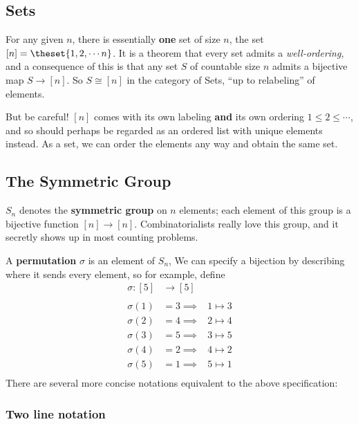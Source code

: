 \hypertarget{sets}{%
\subsection{Sets}\label{sets}}

For any given \(n\), there is essentially \textbf{one} set of size
\(n\), the set \([n] = \theset{1,2,\cdots n}\). It is a theorem that
every set admits a \emph{well-ordering}, and a consequence of this is
that any set \(S\) of countable size \(n\) admits a bijective map
\(S \to [n]\). So \(S \cong [n]\) in the category of Sets, ``up to
relabeling'' of elements.

But be careful! \([n]\) comes with its own labeling \textbf{and } its
own ordering \(1 \leq 2 \leq \cdots\), and so should perhaps be regarded
as an ordered list with unique elements instead. As a set, we can order
the elements any way and obtain the same set.

\hypertarget{the-symmetric-group}{%
\subsection{The Symmetric Group}\label{the-symmetric-group}}

\(S_n\) denotes the \textbf{symmetric group} on \(n\) elements; each
element of this group is a bijective function \([n]\to[n]\).
Combinatorialists really love this group, and it secretly shows up in
most counting problems.

A \textbf{permutation} \(\sigma\) is an element of \(S_n\), We can
specify a bijection by describing where it sends every element, so for
example, define \[\begin{aligned}
\sigma: [5] &\to [5] &\\ \\
\sigma(1) &= 3 \implies &1 \mapsto 3 \\
\sigma(2) &= 4 \implies &2 \mapsto 4 \\
\sigma(3) &= 5 \implies &3 \mapsto 5 \\
\sigma(4) &= 2 \implies &4 \mapsto 2 \\
\sigma(5) &= 1 \implies &5 \mapsto 1 \\
\end{aligned}\] There are several more concise notations equivalent to
the above specification:

\hypertarget{two-line-notation}{%
\subsubsection{Two line notation}\label{two-line-notation}}


